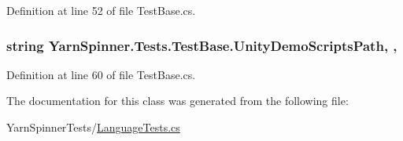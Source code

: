 Definition at line 52 of file Test\-Base.\-cs.

\hypertarget{a00164_a39922286f6255e4fd0e433a4fc7521c4}{
\subsubsection[{Unity\-Demo\-Scripts\-Path}]{\setlength{\rightskip}{0pt plus 5cm}string Yarn\-Spinner.\-Tests.\-Test\-Base.\-Unity\-Demo\-Scripts\-Path\hspace{0.3cm}{\ttfamily [static]}, {\ttfamily [get]}, {\ttfamily [inherited]}}}\label{a00164_a39922286f6255e4fd0e433a4fc7521c4}


Definition at line 60 of file Test\-Base.\-cs.



The documentation for this class was generated from the following file\-:\begin{DoxyCompactItemize}
\item 
Yarn\-Spinner\-Tests/\hyperlink{a00317}{Language\-Tests.\-cs}\end{DoxyCompactItemize}
